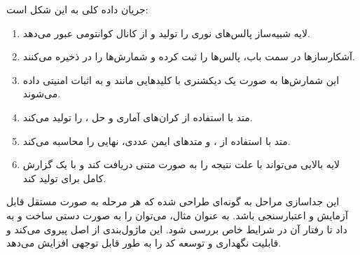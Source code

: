 جریان داده کلی به این شکل است:
\begin{enumerate}
	\item لایه شبیه‌ساز پالس‌های نوری را تولید و از کانال کوانتومی عبور می‌دهد.
	\item آشکارسازها در سمت باب، پالس‌ها را ثبت کرده و شمارش‌ها را در  ذخیره می‌کنند.
	\item این شمارش‌ها به صورت یک دیکشنری  با کلیدهایی مانند  و  به اثبات امنیتی داده می‌شوند.
	\item متد  با استفاده از کران‌های آماری  و حل ،  را تولید می‌کند.
	\item متد  با استفاده از ،  و متدهای ایمن عددی،  نهایی را محاسبه می‌کند.
	\item لایه بالایی می‌تواند با  علت نتیجه را به صورت متنی دریافت کند و با  یک گزارش کامل برای  تولید کند.
\end{enumerate}

این جداسازی مراحل به گونه‌ای طراحی شده که هر مرحله به صورت مستقل قابل آزمایش و اعتبارسنجی باشد. به عنوان مثال، می‌توان  را به صورت دستی ساخت و به  داد تا رفتار آن در شرایط خاص بررسی شود. این ماژول‌بندی از اصل  پیروی می‌کند و قابلیت نگهداری و توسعه کد را به طور قابل توجهی افزایش می‌دهد.
